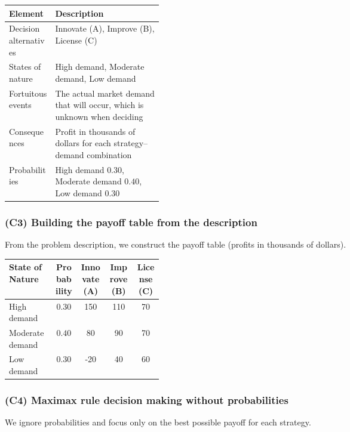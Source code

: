 	\begin{center}
		\begin{tabularx}{\linewidth}{@{}L{0.3\linewidth}Y@{}}
			\toprule
			Element & Description \\
			\midrule
			Decision alternatives & Innovate (A), Improve (B), License (C) \\
			States of nature & High demand, Moderate demand, Low demand \\
			Fortuitous events & The actual market demand that will occur, which is unknown when deciding \\
			Consequences & Profit in thousands of dollars for each strategy--demand combination \\
			Probabilities & High demand \(0.30\), Moderate demand \(0.40\), Low demand \(0.30\) \\
			\bottomrule
		\end{tabularx}
	\end{center}
	
	\subsubsection{(C3) Building the payoff table from the description}\label{example-1-c3}
	
	From the problem description, we construct the payoff table (profits in thousands of dollars).
	
	\begin{center}
		\begin{tabularx}{\linewidth}{@{}L{0.3\linewidth}C C C C@{}}
			\toprule
			State of Nature & Probability & Innovate (A) & Improve (B) & License (C) \\
			\midrule
			High demand     & \(0.30\) & 150  & 110 & 70 \\
			Moderate demand & \(0.40\) & 80   & 90  & 70 \\
			Low demand      & \(0.30\) & -20  & 40  & 60 \\
			\bottomrule
		\end{tabularx}
	\end{center}
	
	\subsubsection{(C4) Maximax rule decision making without probabilities}\label{example-1-c4}
	
	We ignore probabilities and focus only on the best possible payoff for each strategy.
	
